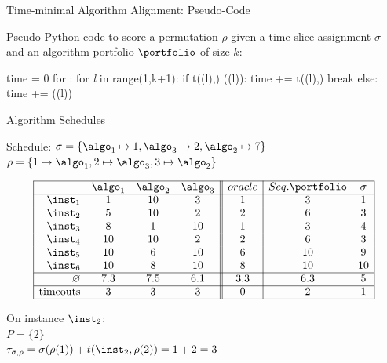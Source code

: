 \begin{frame}[c,fragile]{Time-minimal Algorithm Alignment: Pseudo-Code}

Pseudo-Python-code to score a permutation $\rho$ given a time slice assignment $\sigma$
and an algorithm portfolio $\portfolio$ of size $k$:

\begin{semiverbatim}
time = 0
for \inst \in \insts:
  for \emph{l} in range(1,k+1):
    if t(\rho(l),\inst) \leq \sigma(\rho(l)):
        time += t(\rho(l),\inst)
        break
    else:
        time += \sigma(\rho(l))
\end{semiverbatim}

\end{frame}
\begin{frame}[c]{Algorithm Schedules}

Schedule: $\sigma = \{\algo_1 \mapsto 1, \algo_3 \mapsto 2, \algo_2 \mapsto 7\}$\\
$\rho = \{1 \mapsto \algo_1, 2 \mapsto \algo_3, 3 \mapsto \algo_2\}$


\[
\begin{array}{| r | c  c  c || c | c c |}
  \cline{1-7}
      & \algo_1 & \algo_2 & \algo_3 & oracle & Seq. \portfolio & \sigma\\
  \cline{1-7}
  \inst_1 & 		 1    &         10  &         3    & 1  & 3 & 1\\
  \inst_2 &          5    &         10  &  		2 	  & 2 & 6 & 3\\
  \inst_3 &          8    &  		1    &         10  & 1 & 3 & 4\\
  \inst_4 &         10  &         10  & 		2 	  & 2 & 6 & 3\\
  \inst_5 &         10  & 		 6    &         10  & 6 & 10 & 9\\
  \inst_6 &         10  &          8    &         10  & 8 & 10 & 10\\
  \cline{1-7}
  \varnothing & 7.3 & 7.5 & 6.1 & 3.3 & 6.3 & 5\\
  \cline{1-7}
  \text{timeouts} & 3 & 3 & 3 & 0 & 2 & 1\\ 
  \cline{1-7}
\end{array}
\]

On instance $\inst_2$:\\
$P = \{2\}$\\
\pause
$\tau_{\sigma, \rho} = \sigma(\rho(1)) + t(\inst_2, \rho(2)) = 1 + 2 = 3$

\end{frame}
